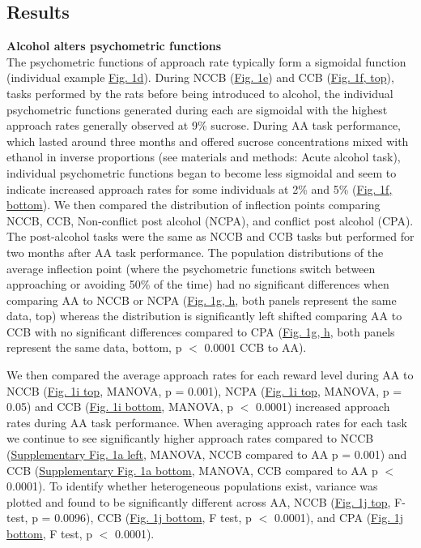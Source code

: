 \documentclass{article}
\begin{document}
\subsection{Results}
\noindent\textbf{Alcohol alters psychometric functions}\\
The psychometric functions of approach rate typically form a sigmoidal function (individual example \hyperref[fig:alcohol_main_1]{Fig. 1d}). During NCCB (\hyperref[fig:alcohol_main_1]{Fig. 1e}) and CCB (\hyperref[fig:alcohol_main_1]{Fig. 1f, top}), tasks performed by the rats before being introduced to alcohol, the individual psychometric functions generated during each are sigmoidal with the highest approach rates generally observed at 9\% sucrose. During AA task performance, which lasted around three months and offered sucrose concentrations mixed with ethanol in inverse proportions (see materials and methods: Acute alcohol task), individual psychometric functions began to become less sigmoidal and seem to indicate increased approach rates for some individuals at 2\% and 5\% (\hyperref[fig:alcohol_main_1]{Fig. 1f, bottom}). We then compared the distribution of inflection points comparing NCCB, CCB, Non-conflict post alcohol (NCPA), and conflict post alcohol (CPA). The post-alcohol tasks were the same as NCCB and CCB tasks but performed for two months after AA task performance. The population distributions of the average inflection point (where the psychometric functions switch between approaching or avoiding 50\% of the time) had no significant differences when comparing AA to NCCB or NCPA (\hyperref[fig:alcohol_main_1]{Fig. 1g, h}, both panels represent the same data, top) whereas the distribution is significantly left shifted comparing AA to CCB with no significant differences compared to CPA (\hyperref[fig:alcohol_main_1]{Fig. 1g, h}, both panels represent the same data, bottom, p $<$ 0.0001 CCB to AA).

\vspace{1em}

We then compared the average approach rates for each reward level during AA to NCCB (\hyperref[fig:alcohol_main_1]{Fig. 1i top}, MANOVA, p = 0.001), NCPA (\hyperref[fig:alcohol_main_1]{Fig. 1i top}, MANOVA, p = 0.05) and CCB (\hyperref[fig:alcohol_main_1]{Fig. 1i bottom}, MANOVA, p $<$ 0.0001) increased approach rates during AA task performance. When averaging approach rates for each task we continue to see significantly higher approach rates compared to NCCB (\hyperref[fig:Alcohol_SI_1]{Supplementary Fig. 1a left}, MANOVA, NCCB compared to AA p = 0.001) and CCB (\hyperref[fig:Alcohol_SI_1]{Supplementary Fig. 1a bottom}, MANOVA, CCB compared to AA p $<$ 0.0001). To identify whether heterogeneous populations exist, variance was plotted and found to be significantly different across AA, NCCB (\hyperref[fig:alcohol_main_1]{Fig. 1j top}, F-test, p = 0.0096), CCB (\hyperref[fig:alcohol_main_1]{Fig. 1j bottom}, F test, p $<$ 0.0001), and CPA (\hyperref[fig:alcohol_main_1]{Fig. 1j bottom}, F test, p $<$ 0.0001).
\end{document}
